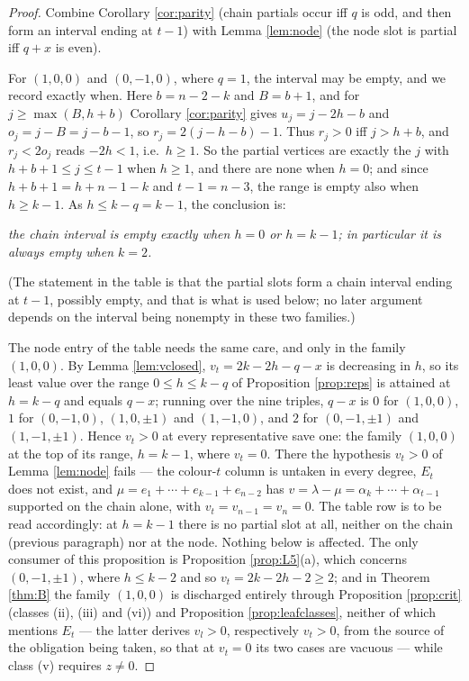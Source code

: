 \documentclass[reqno]{amsart}
\theoremstyle{plain}
\theoremstyle{definition}
\newcommand{\la}{\lambda}
\newcommand{\al}{\alpha}
\begin{document}
\begin{proof}
Combine Corollary \ref{cor:parity} (chain partials occur iff $q$ is odd, and
then form an interval ending at $t-1$) with Lemma \ref{lem:node} (the node slot
is partial iff $q+x$ is even).

For $(1,0,0)$ and $(0,-1,0)$, where $q=1$, the interval may be empty, and we
record exactly when.  Here $b=n-2-k$ and $B=b+1$, and for
$j\ge\max(B,h+b)$ Corollary \ref{cor:parity} gives $u_j=j-2h-b$ and
$o_j=j-B=j-b-1$, so $r_j=2(j-h-b)-1$.  Thus $r_j>0$ iff $j>h+b$, and
$r_j<2o_j$ reads $-2h<1$, i.e.\ $h\ge1$.  So the partial vertices are exactly
the $j$ with $h+b+1\le j\le t-1$ when $h\ge1$, and there are none when $h=0$;
and since $h+b+1=h+n-1-k$ and $t-1=n-3$, the range is empty also when
$h\ge k-1$.  As $h\le k-q=k-1$, the conclusion is:
\begin{center}
\emph{the chain interval is empty exactly when $h=0$ or $h=k-1$; in
particular it is always empty when $k=2$.}
\end{center}
(The statement in the table is that the partial slots form a chain interval
ending at $t-1$, possibly empty, and that is what is used below; no later
argument depends on the interval being nonempty in these two families.)

The node entry of the table needs the same care, and only in the family
$(1,0,0)$.  By Lemma \ref{lem:vclosed}, $v_t=2k-2h-q-x$ is decreasing in $h$,
so its least value over the range $0\le h\le k-q$ of Proposition
\ref{prop:reps} is attained at $h=k-q$ and equals $q-x$; running over the nine
triples, $q-x$ is $0$ for $(1,0,0)$, $1$ for $(0,-1,0)$, $(1,0,\pm1)$ and
$(1,-1,0)$, and $2$ for $(0,-1,\pm1)$ and $(1,-1,\pm1)$.  Hence $v_t>0$ at
every representative save one: the family $(1,0,0)$ at the top of its range,
$h=k-1$, where $v_t=0$.  There the hypothesis $v_t>0$ of Lemma \ref{lem:node}
fails --- the colour-$t$ column is untaken in every degree, $E_t$ does not
exist, and $\mu=e_1+\cdots+e_{k-1}+e_{n-2}$ has $v=\la-\mu=\al_k+\cdots+
\al_{t-1}$ supported on the chain alone, with $v_t=v_{n-1}=v_n=0$.  The table
row is to be read accordingly: at $h=k-1$ there is no partial slot at all,
neither on the chain (previous paragraph) nor at the node.  Nothing below is
affected.  The only consumer of this proposition is Proposition
\ref{prop:L5}(a), which concerns $(0,-1,\pm1)$, where $h\le k-2$ and so
$v_t=2k-2h-2\ge2$; and in Theorem \ref{thm:B} the family $(1,0,0)$ is
discharged entirely through Proposition \ref{prop:crit} (classes (ii), (iii)
and (vi)) and Proposition \ref{prop:leafclasses}, neither of which mentions
$E_t$ --- the latter derives $v_l>0$, respectively $v_t>0$, from the source of
the obligation being taken, so that at $v_t=0$ its two cases are vacuous ---
while class (v) requires $z\ne0$.
\end{proof}
\end{document}
